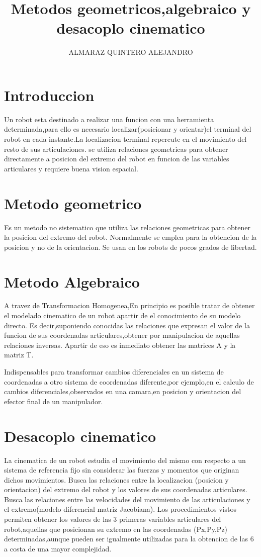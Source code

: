\documentclass[12pt,a4paper]{article}
\author{ALMARAZ QUINTERO ALEJANDRO}
\title{Metodos geometricos,algebraico y desacoplo cinematico}
\begin{document}
\maketitle
\section{Introduccion}
Un robot esta destinado a realizar una funcion con una herramienta determinada,para ello es necesario localizar(posicionar y orientar)el terminal del robot en cada instante.La localizacion terminal repercute en el movimiento del resto de sus articulaciones.
se utiliza relaciones geometricas para obtener directamente a posicion del extremo del robot en funcion de las variables articulares y requiere buena vision espacial.
\section{Metodo geometrico}
Es un metodo no sistematico que utiliza las relaciones geometricas para obtener la posicion del extremo del robot.
Normalmente se emplea para la obtencion de la posicion y no de la orientacion.
Se usan en los robots de pocos grados de libertad.
\section{Metodo Algebraico}
A travez de Transformacion Homogenea,En principio es posible tratar de obtener el modelado cinematico de un robot apartir de el conocimiento de su modelo directo.
Es decir,suponiendo conocidas las relaciones que expresan el valor de la funcion de sus coordenadas articulares,obtener por manipulacion de aquellas relaciones inversas.
Apartir de eso es inmediato obtener las matrices A y la matriz T.

Indispensables para transformar cambios diferenciales en un sistema de coordenadas a otro sistema de coordenadas diferente,por ejemplo,en el calculo de cambios diferenciales,observados en una camara,en posicion y orientacion del efector final de un manipulador.

\section{Desacoplo cinematico}
La cinematica de un robot estudia el movimiento del mismo con respecto a un sistema de referencia fijo sin considerar las fuerzas y momentos que originan dichos movimientos.
Busca las relaciones entre la localizacion (posicion y orientacion) del extremo del robot y los valores de sus coordenadas articulares.
Busca las relaciones entre las velocidades del movimiento de las articulaciones y el extremo(modelo-diferencial-matriz Jacobiana).
Los procedimientos vistos permiten obtener los valores de las 3 primeras variables articulares del robot,aquellas que posicionan su extremo en las coordenadas (Px,Py,Pz) determinadas,aunque pueden ser igualmente utilizadas para la obtencion de las 6 a costa de una mayor complejidad.
\end{document}

